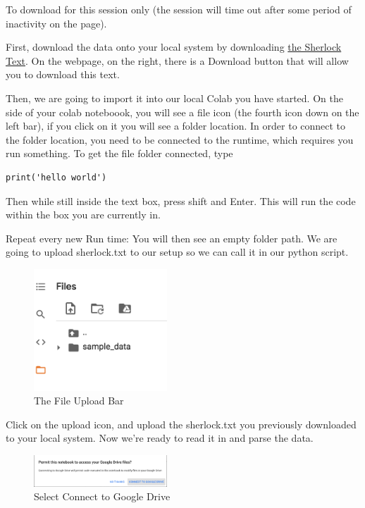 \documentclass{article}
\begin{document}
To download for this session only (the session will time out after some period of inactivity on the page).

First, download the data onto your local system by downloading 
\href{https://github.com/CatMcQueen/catmcqueen.github.io/blob/b67a282c9be6bfd1ed17796c2507b9108cffb6bc/sherlock.txt}{the Sherlock Text}. On the webpage, on the right, there is a Download button that will allow you to download this text.

Then, we are going to import it into our local Colab you have started. On the side of your colab noteboook, you will see a file icon (the fourth icon down on the left bar), if you click on it you will see a folder location. In order to connect to the folder location, you need to be connected to the runtime, which requires you run something. To get the file folder connected, type
\begin{verbatim}
print('hello world')
\end{verbatim} 
Then while still inside the text box, press shift and Enter. This will run the code within the box you are currently in.

Repeat every new Run time:
You will then see an empty folder path. We are going to upload sherlock.txt to our setup so we can call it in our python script.

\begin{figure}[h!]
\centering
\includegraphics[width=50mm]{FileFolder.png}
\caption{The File Upload Bar}
\label{fig:filefolder}
\end{figure}

Click on the upload icon, and upload the sherlock.txt you previously downloaded to your local system. Now we're ready to read it in and parse the data.

\begin{figure}[h!]
\centering
\includegraphics[width=50mm]{GoogleDriveConnect.png}
\caption{Select Connect to Google Drive}
\label{fig:connectdrive}
\end{figure}
\end{document}
